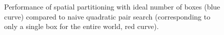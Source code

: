 \begin{figure}[htb]
       \begin{center}
               \scalebox{0.9}{
                        \nonstopmode
                        
                        \errorstopmode
                        \rule[-0.5cm]{0cm}{0cm}}
                \caption{Performance of spatial partitioning with ideal number of boxes (blue curve) compared to naive quadratic pair search (corresponding to only a single box for the entire world, red curve).}
                \label{spacePartVsNoSpacePart}
        \end{center}
\end{figure}

